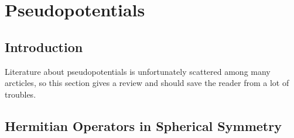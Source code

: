 \chapter{Pseudopotentials}

\section{Introduction}

Literature about pseudopotentials is unfortunately scattered among many
arcticles, so this section gives a review and should save the reader from a lot
of troubles.

\section{Hermitian Operators in Spherical Symmetry}

